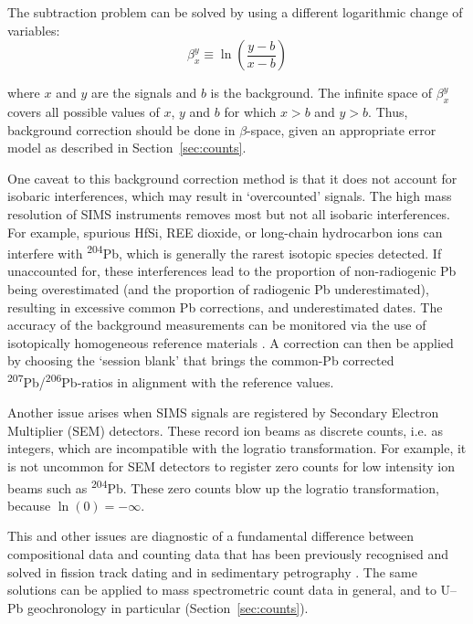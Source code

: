 \documentclass{article}
\begin{document}
The subtraction problem can be solved by using a different logarithmic
change of variables:
\begin{equation}
  \beta^y_x \equiv \ln\!\left(\frac{y - b}{x - b}\right)
\end{equation}

\noindent where $x$ and $y$ are the signals and $b$ is the
background. The infinite space of $\beta^y_x$ covers all possible
values of $x$, $y$ and $b$ for which $x > b$ and $y > b$.  Thus,
background correction should be done in $\beta$-space, given an
appropriate error model as described in
Section~\ref{sec:counts}.\medskip

One caveat to this background correction method is that it does not
account for isobaric interferences, which may result in `overcounted'
signals. The high mass resolution of SIMS instruments removes most but
not all isobaric interferences. For example, spurious HfSi, REE
dioxide, or long-chain hydrocarbon ions can interfere with
\textsuperscript{204}Pb, which is generally the rarest isotopic
species detected. If unaccounted for, these interferences lead to the
proportion of non-radiogenic Pb being overestimated (and the
proportion of radiogenic Pb underestimated), resulting in excessive
common Pb corrections, and underestimated dates.  The accuracy of the
background measurements can be monitored via the use of isotopically
homogeneous reference materials \citep{black2005}. A correction can
then be applied by choosing the `session blank' that brings the
common-Pb corrected
\textsuperscript{207}Pb/\textsuperscript{206}Pb-ratios in alignment
with the reference values.\medskip

Another issue arises when SIMS signals are registered by Secondary
Electron Multiplier (SEM) detectors. These record ion beams as
discrete counts, i.e. as integers, which are incompatible with the
logratio transformation. For example, it is not uncommon for SEM
detectors to register zero counts for low intensity ion beams such as
\textsuperscript{204}Pb.  These zero counts blow up the logratio
transformation, because $\ln(0)=-\infty$.\medskip

This and other issues are diagnostic of a fundamental difference
between compositional data and counting data that has been previously
recognised and solved in fission track dating \citep{galbraith2005}
and in sedimentary petrography \citep{vermeesch2018d}.  The same
solutions can be applied to mass spectrometric count data in general,
and to U--Pb geochronology in particular (Section~\ref{sec:counts}).
\end{document}
